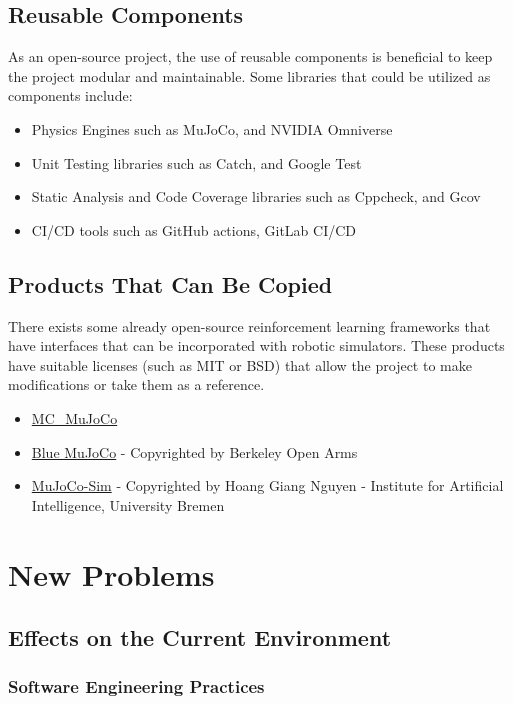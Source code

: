 \documentclass[12pt]{article}
\newcommand{\lips}{\textit{Insert your content here.}}
\begin{document}
\subsection{Reusable Components}
As an open-source project, the use of reusable components is beneficial to keep the project modular and maintainable. Some libraries that could be utilized as components include:
\begin{itemize}
  \item Physics Engines such as MuJoCo, and NVIDIA Omniverse
  \item Unit Testing libraries such as Catch, and Google Test
  \item Static Analysis and Code Coverage libraries such as Cppcheck, and Gcov
  \item CI/CD tools such as GitHub actions, GitLab CI/CD
\end{itemize}

\subsection{Products That Can Be Copied}
There exists some already open-source reinforcement learning frameworks that have interfaces that can be incorporated with robotic simulators. These products have suitable licenses (such as MIT or BSD) that allow the project to make modifications or take them as a reference.
\begin{itemize}
  \item \href{https://github.com/rohanpsingh/mc\_mujoco}{MC\_MuJoCo}
  \item \href{https://github.com/berkeleyopenarms/blue_mujoco_v1?tab=readme-ov-file}{Blue MuJoCo} - Copyrighted by Berkeley Open Arms
  \item \href{https://github.com/HoangGiang93/mujoco_sim?tab=readme-ov-file}{MuJoCo-Sim} - Copyrighted by Hoang Giang Nguyen - Institute for Artificial Intelligence, University Bremen
\end{itemize}
\section{New Problems}
\subsection{Effects on the Current Environment}

\subsubsection{Software Engineering Practices}
\end{document}
